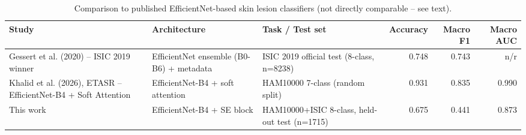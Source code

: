 \begin{table}
\caption{Comparison to published EfficientNet-based skin lesion classifiers (not directly comparable -- see text).}
\label{tab:table3_sota_comparison}
\begin{tabular}{p{4.5cm}p{3.5cm}p{4.5cm}rrr}
\toprule
Study & Architecture & Task / Test set & Accuracy & Macro F1 & Macro AUC \\
\midrule
Gessert et al. (2020) -- ISIC 2019 winner & EfficientNet ensemble (B0-B6) + metadata & ISIC 2019 official test (8-class, n=8238) & 0.748 & 0.743 & n/r \\
Khalid et al. (2026), ETASR -- EfficientNet-B4 + Soft Attention & EfficientNet-B4 + soft attention & HAM10000 7-class (random split) & 0.931 & 0.835 & 0.990 \\
This work & EfficientNet-B4 + SE block & HAM10000+ISIC 8-class, held-out test (n=1715) & 0.675 & 0.441 & 0.873 \\
\bottomrule
\end{tabular}
\end{table}
